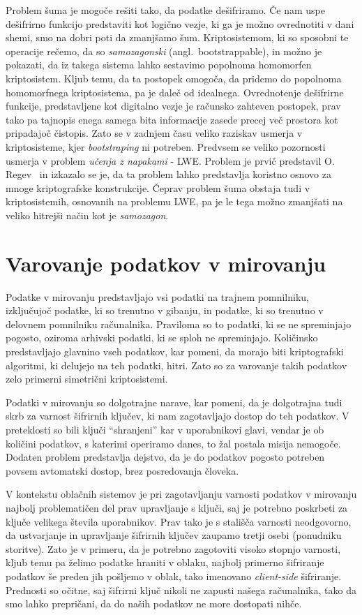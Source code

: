 \documentclass[12pt,a4paper,openany,tikz]{book}
\theoremstyle{plain}
\theoremstyle{definition}
\begin{document}
Problem šuma je mogoče rešiti tako, da podatke dešifriramo. Če nam uspe dešifrirno funkcijo predstaviti kot logično vezje, ki ga je možno ovrednotiti v dani shemi, smo na dobri poti da zmanjšamo šum. Kriptosistemom, ki so sposobni te operacije rečemo, da so \textit{samozagonski} (angl.\ bootstrappable), in možno je pokazati, da iz takega sistema lahko sestavimo popolnoma homomorfen kriptosistem. Kljub temu, da ta postopek omogoča, da pridemo do popolnoma homomorfnega kriptosistema, pa je daleč od idealnega. Ovrednotenje dešifrirne funkcije, predstavljene kot digitalno vezje je računsko zahteven postopek, prav tako pa tajnopis enega samega bita informacije zasede precej več prostora kot pripadajoč čistopis. Zato se v zadnjem času veliko raziskav usmerja v kriptosisteme, kjer \textit{bootstraping} ni potreben. Predvsem se veliko pozornosti usmerja v problem \textit{učenja z napakami} - \acrfull{LWE}. Problem je prvič predstavil O. Regev~\cite{regev2009lattices} in izkazalo se je, da ta problem lahko predstavlja koristno osnovo za mnoge kriptografske konstrukcije. Čeprav problem šuma obstaja tudi v kriptosistemih, osnovanih na problemu \acrshort{LWE}, pa je le tega možno zmanjšati na veliko hitrejši način kot je \textit{samozagon}.

\section{Varovanje podatkov v mirovanju}
\label{sec:Varovanje podatkov v mirovanju}

Podatke v mirovanju predstavljajo vsi podatki na trajnem pomnilniku, izključujoč podatke, ki so trenutno v gibanju, in podatke, ki so trenutno v delovnem pomnilniku računalnika. Praviloma so to podatki, ki se ne spreminjajo pogosto, oziroma arhivski podatki, ki se sploh ne spreminjajo. Količinsko predstavljajo glavnino vseh podatkov, kar pomeni, da morajo biti kriptografski algoritmi, ki delujejo na teh podatki, hitri. Zato so za varovanje takih podatkov zelo primerni simetrični kriptosistemi.

Podatki v mirovanju so dolgotrajne narave, kar pomeni, da je dolgotrajna tudi skrb za varnost šifrirnih ključev, ki nam zagotavljajo dostop do teh podatkov. V preteklosti so bili ključi ``shranjeni'' kar v uporabnikovi glavi, vendar je ob količini podatkov, s katerimi operiramo danes, to žal postala misija nemogoče. Dodaten problem predstavlja dejstvo, da je do podatkov pogosto potreben povsem avtomatski dostop, brez posredovanja človeka.

V kontekstu oblačnih sistemov je pri zagotavljanju varnosti podatkov v mirovanju najbolj problematičen del prav upravljanje s ključi, saj je potrebno poskrbeti za ključe velikega števila uporabnikov. Prav tako je s stališča varnosti neodgovorno, da ustvarjanje in upravljanje šifrirnih ključev zaupamo tretji osebi (ponudniku storitve). Zato je v primeru, da je potrebno zagotoviti visoko stopnjo varnosti, kljub temu pa želimo podatke hraniti v oblaku, najbolj primerno šifriranje podatkov še preden jih pošljemo v oblak, tako imenovano \textit{client-side} šifriranje. Prednosti so očitne, saj šifrirni ključ nikoli ne zapusti našega računalnika, tako da smo lahko prepričani, da do naših podatkov ne more dostopati nihče.
\end{document}
